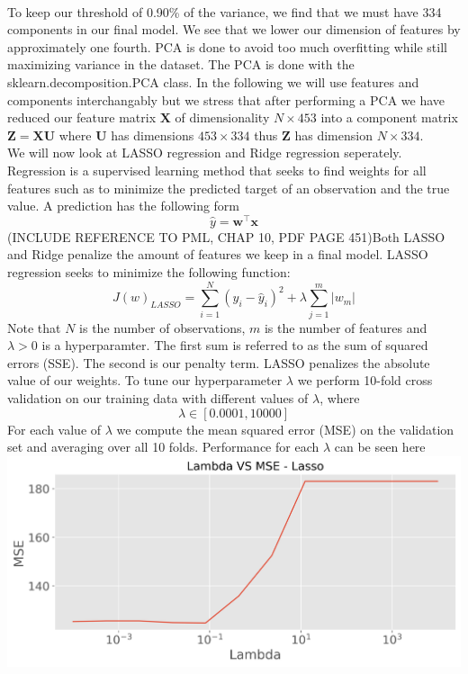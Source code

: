 \documentclass[12pt,a4paper]{article}
\begin{document}
\\
To keep our threshold of 0.90\% of the variance, we find that we must have 334 components in our final model. We see that we lower our dimension of features by approximately one fourth. PCA is done to avoid too much overfitting while still maximizing variance in the dataset. The PCA is done with the sklearn.decomposition.PCA class. In the following we will use features and components interchangably but we stress that after performing a PCA we have reduced our feature matrix $\boldsymbol{X}$ of dimensionality $N\times 453$ into a component matrix $\boldsymbol{Z} = \boldsymbol{X}\boldsymbol{U}$ where $\boldsymbol{U}$ has dimensions $453\times 334$ thus $\boldsymbol{Z}$ has dimension $N\times 334$. \\
We will now look at LASSO regression and Ridge regression seperately. Regression is a supervised learning method that seeks to find weights for all features such as to minimize the predicted target of an observation and the true value. A prediction has the following form
$$\hat{y} = \boldsymbol{w}^\intercal \boldsymbol{x}$$
(INCLUDE REFERENCE TO PML, CHAP 10, PDF PAGE 451)Both LASSO and Ridge penalize the amount of features we keep in a final model. LASSO regression seeks to minimize the following function:
$$J(w)_{LASSO} = \sum_{i = 1}^{N}(y_i - \hat{y}_i)^2 + \lambda \sum_{j=1}^{m}|w_m|$$
Note that $N$ is the number of observations, $m$ is the number of features and $\lambda >0$ is a hyperparamter. The first sum is referred to as the sum of squared errors (SSE). The second is our penalty term. LASSO penalizes the absolute value of our weights. To tune our hyperparameter $\lambda$ we perform 10-fold cross validation on our training data with different values of $\lambda$, where
$$\lambda \in [0.0001, 10000]$$ 
For each value of $\lambda$ we compute the mean squared error (MSE) on the validation set and averaging over all 10 folds. Performance for each $\lambda$ can be seen here\\
\includegraphics[scale = 0.7]{Lasso_MSE.png}
\end{document}
